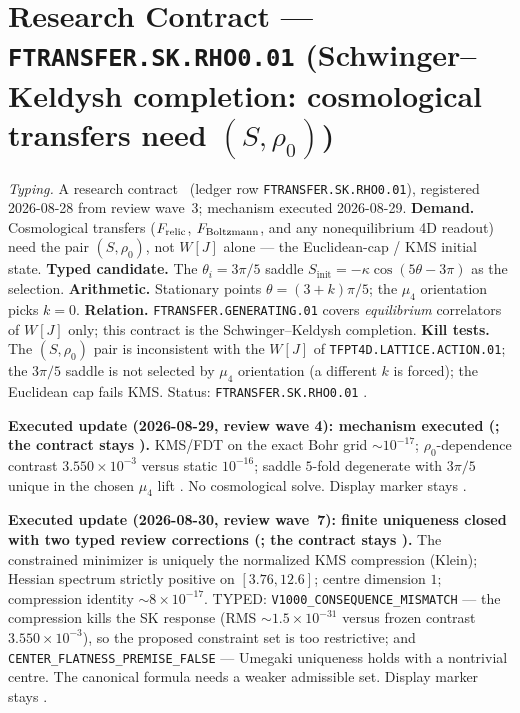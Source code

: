 \section*{Research Contract --- \texttt{FTRANSFER.SK.RHO0.01} (Schwinger--Keldysh completion: cosmological transfers need $(S,\rho_0)$)}
\noindent\emph{Typing.} A research contract \mO\ (ledger row \texttt{FTRANSFER.SK.RHO0.01}),
registered 2026-08-28 from review wave~3; mechanism executed 2026-08-29.  \textbf{Demand.}  Cosmological
transfers ($F_{\rm relic}$, $F_{\rm Boltzmann}$, and any nonequilibrium 4D readout) need the pair
$(S,\rho_0)$, not $W[J]$ alone --- the Euclidean-cap / KMS initial state.  \textbf{Typed
candidate.}  The $\theta_i=3\pi/5$ saddle $S_{\mathrm{init}}=-\kappa\cos(5\theta-3\pi)$ as the
selection.  \textbf{Arithmetic.}  Stationary points $\theta=(3+k)\pi/5$; the $\mu_4$ orientation
picks $k=0$.  \textbf{Relation.}  \texttt{FTRANSFER.GENERATING.01} covers \emph{equilibrium}
correlators of $W[J]$ only; this contract is the Schwinger--Keldysh completion.
\textbf{Kill tests.}  The $(S,\rho_0)$ pair is inconsistent with the $W[J]$ of
\texttt{TFPT4D.LATTICE.ACTION.01}; the $3\pi/5$ saddle is not selected by $\mu_4$ orientation (a
different $k$ is forced); the Euclidean cap fails KMS.
Status: \texttt{FTRANSFER.SK.RHO0.01} \mO.

\par\smallskip\noindent\textbf{Executed update (2026-08-29, review wave 4): mechanism executed
(; the contract stays \mO).}
KMS/FDT on the exact Bohr grid $\sim10^{-17}$; $\rho_0$-dependence contrast $3.550\times10^{-3}$
versus static $10^{-16}$; saddle $5$-fold degenerate with $3\pi/5$ unique in the chosen $\mu_4$
lift \mC.  No cosmological solve.  Display marker stays \mO.

\par\smallskip\noindent\textbf{Executed update (2026-08-30, review wave~7): finite uniqueness
closed with two typed review corrections
(; the contract stays \mO).}
The constrained minimizer is uniquely the normalized KMS compression (Klein); Hessian spectrum
strictly positive on $[3.76,12.6]$; centre dimension $1$; compression identity
$\sim8{\times}10^{-17}$.  TYPED: \texttt{V1000\_CONSEQUENCE\_MISMATCH} --- the compression
kills the SK response (RMS $\sim1.5{\times}10^{-31}$ versus frozen contrast
$3.550{\times}10^{-3}$), so the proposed constraint set is too restrictive; and
\texttt{CENTER\_FLATNESS\_PREMISE\_FALSE} --- Umegaki uniqueness holds with a nontrivial centre.
The canonical formula needs a weaker admissible set.  Display marker stays \mO.

